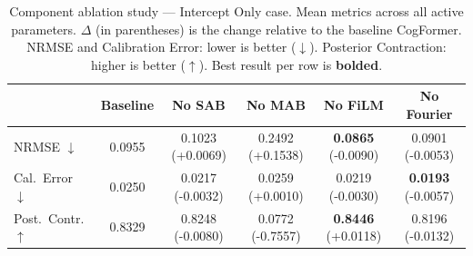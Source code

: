 \begin{table}[t]
\centering
\caption{Component ablation study — Intercept Only case. Mean metrics across
all active parameters. $\Delta$ (in parentheses) is the change relative to the
baseline CogFormer. NRMSE and Calibration Error: lower is better ($\downarrow$).
Posterior Contraction: higher is better ($\uparrow$). Best result per row is
\textbf{bolded}.}
\label{tab:component_ablation_intercept_only}
\begin{tabular}{lccccc}
\toprule
 & Baseline & No SAB & No MAB & No FiLM & No Fourier \\
\midrule
NRMSE $\downarrow$ & 0.0955 & 0.1023 \small{(+0.0069)} & 0.2492 \small{(+0.1538)} & \textbf{0.0865} \small{(-0.0090)} & 0.0901 \small{(-0.0053)} \\
Cal.\ Error $\downarrow$ & 0.0250 & 0.0217 \small{(-0.0032)} & 0.0259 \small{(+0.0010)} & 0.0219 \small{(-0.0030)} & \textbf{0.0193} \small{(-0.0057)} \\
Post.\ Contr. $\uparrow$ & 0.8329 & 0.8248 \small{(-0.0080)} & 0.0772 \small{(-0.7557)} & \textbf{0.8446} \small{(+0.0118)} & 0.8196 \small{(-0.0132)} \\
\bottomrule
\end{tabular}
\end{table}